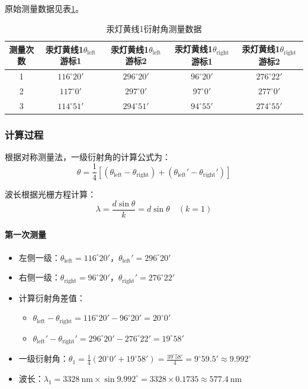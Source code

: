 \documentclass[11pt]{article}
\begin{document}
原始测量数据见表\ref{tab:yellow_line1_data}。

\begin{table}[htbp]
  \centering
  \caption{汞灯黄线1衍射角测量数据}
  \vspace{0.5em}
  \label{tab:yellow_line1_data}
  \begin{tabular}{ccccc}
    \toprule
    测量次数 & 汞灯黄线1\(\theta_{\text{left}}\)游标1 & 汞灯黄线1\(\theta_{\text{left}}\)游标2 & 汞灯黄线1\(\theta_{\text{right}}\)游标1 & 汞灯黄线1\(\theta_{\text{right}}\)游标2 \\
    \midrule
    1 & \(116^\circ20'\) & \(296^\circ20'\) & \(96^\circ20'\) & \(276^\circ22'\) \\
    2 & \(117^\circ0'\) & \(297^\circ0'\) & \(97^\circ0'\) & \(277^\circ0'\) \\
    3 & \(114^\circ51'\) & \(294^\circ51'\) & \(94^\circ55'\) & \(274^\circ55'\) \\
    \bottomrule
  \end{tabular}
\end{table}

\subsubsection{计算过程}

根据对称测量法，一级衍射角的计算公式为：
\[
\theta = \frac{1}{4}\left[(\theta_{\text{left}} - \theta_{\text{right}}) + (\theta_{\text{left}}' - \theta_{\text{right}}')\right]
\]

波长根据光栅方程计算：
\[
\lambda = \frac{d\sin\theta}{k} = d\sin\theta \quad (k=1)
\]

\paragraph{第一次测量}

\begin{itemize}[itemsep=0.3ex]
\item 左侧一级：\(\theta_{\text{left}} = 116^\circ20'\)，\(\theta_{\text{left}}' = 296^\circ20'\)
\item 右侧一级：\(\theta_{\text{right}} = 96^\circ20'\)，\(\theta_{\text{right}}' = 276^\circ22'\)
\item 计算衍射角差值：
  \begin{itemize}
  \item \(\theta_{\text{left}} - \theta_{\text{right}} = 116^\circ20' - 96^\circ20' = 20^\circ0'\)
  \item \(\theta_{\text{left}}' - \theta_{\text{right}}' = 296^\circ20' - 276^\circ22' = 19^\circ58'\)
  \end{itemize}
\item 一级衍射角：\(\theta_1 = \frac{1}{4}(20^\circ0' + 19^\circ58') = \frac{39^\circ58'}{4} = 9^\circ59.5' \approx 9.992^\circ\)
\item 波长：\(\lambda_1 = 3328\ \text{nm} \times \sin 9.992^\circ = 3328 \times 0.1735 \approx 577.4\ \text{nm}\)
\end{itemize}
\end{document}

